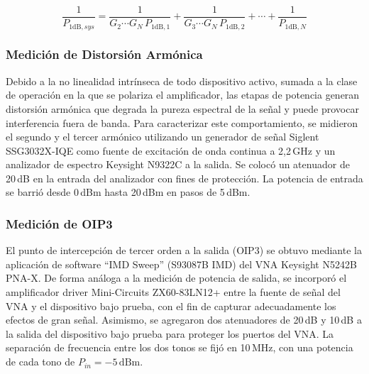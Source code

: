 \begin{equation}
\frac{1}{P_{\text{1dB},sys}} = \frac{1}{G_2 \cdots G_N \, P_{\text{1dB},1}} + \frac{1}{G_3 \cdots G_N \, P_{\text{1dB},2}} + \cdots + \frac{1}{P_{\text{1dB},N}}
\label{eq:p1db_cascada}
\end{equation}

\subsubsection{Medición de Distorsión Armónica}
Debido a la no linealidad intrínseca de todo dispositivo activo, sumada a la clase de operación en la que se polariza el amplificador, las etapas de potencia generan distorsión armónica que degrada la pureza espectral de la señal y puede provocar interferencia fuera de banda. Para caracterizar este comportamiento, se midieron el segundo y el tercer armónico utilizando un generador de señal Siglent SSG3032X-IQE como fuente de excitación de onda continua a 2,2\,GHz y un analizador de espectro Keysight N9322C a la salida. Se colocó un atenuador de 20\,dB en la entrada del analizador con fines de protección. La potencia de entrada se barrió desde 0\,dBm hasta 20\,dBm en pasos de 5\,dBm.

\subsubsection{Medición de OIP3}
El punto de intercepción de tercer orden a la salida (OIP3) se obtuvo mediante la aplicación de software ``IMD Sweep'' (S93087B IMD) del VNA Keysight N5242B PNA-X. De forma análoga a la medición de potencia de salida, se incorporó el amplificador driver Mini-Circuits ZX60-83LN12+ entre la fuente de señal del VNA y el dispositivo bajo prueba, con el fin de capturar adecuadamente los efectos de gran señal. Asimismo, se agregaron dos atenuadores de 20\,dB y 10\,dB a la salida del dispositivo bajo prueba para proteger los puertos del VNA. La separación de frecuencia entre los dos tonos se fijó en 10\,MHz, con una potencia de cada tono de $P_{in} = -5\,\text{dBm}$.